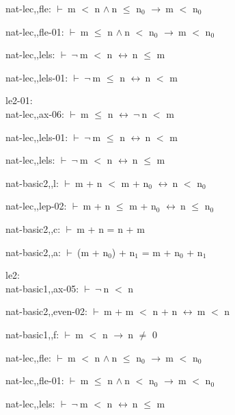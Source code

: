 \documentclass[a4paper]{article}
\newcommand{\Fol}{\mbox{$\vdash\ $}}
\newcommand{\Not}{\mbox{$\neg\ $}}
\newcommand{\And}{\mbox{$\wedge\ $}}
\newcommand{\Imp}{\mbox{$\rightarrow\ $}}
\newcommand{\Equiv}{\mbox{$\leftrightarrow\ $}}
\begin{document}
nat-lec,,fle: 
 \Fol m $<$ n \And n $\le$ $\mbox{n}_{0}$ \Imp m $<$ $\mbox{n}_{0}$



nat-lec,,fle-01: 
 \Fol m $\le$ n \And n $<$ $\mbox{n}_{0}$ \Imp m $<$ $\mbox{n}_{0}$



nat-lec,,lels: 
 \Fol \Not m $<$ n \Equiv n $\le$ m



nat-lec,,lels-01: 
 \Fol \Not m $\le$ n \Equiv n $<$ m



\bigskip

le2-01:\\ nat-lec,,ax-06: 
 \Fol m $\le$ n \Equiv \Not n $<$ m

nat-lec,,lels-01: 
 \Fol \Not m $\le$ n \Equiv n $<$ m



nat-lec,,lels: 
 \Fol \Not m $<$ n \Equiv n $\le$ m



nat-basic2,,l: 
 \Fol m + n $<$ m + $\mbox{n}_{0}$ \Equiv n $<$ $\mbox{n}_{0}$



nat-lec,,lep-02: 
 \Fol m + n $\le$ m + $\mbox{n}_{0}$ \Equiv n $\le$ $\mbox{n}_{0}$



nat-basic2,,c: 
 \Fol m + n = n + m



nat-basic2,,a: 
 \Fol (m + $\mbox{n}_{0}$) + $\mbox{n}_{1}$ = m + $\mbox{n}_{0}$ + $\mbox{n}_{1}$



\bigskip

le2:\\ nat-basic1,,ax-05: 
 \Fol \Not n $<$ n



nat-basic2,,even-02: 
 \Fol m + m $<$ n + n \Equiv m $<$ n



nat-basic1,,f: 
 \Fol m $<$ n \Imp n $\neq$ 0



nat-lec,,fle: 
 \Fol m $<$ n \And n $\le$ $\mbox{n}_{0}$ \Imp m $<$ $\mbox{n}_{0}$



nat-lec,,fle-01: 
 \Fol m $\le$ n \And n $<$ $\mbox{n}_{0}$ \Imp m $<$ $\mbox{n}_{0}$



nat-lec,,lels: 
 \Fol \Not m $<$ n \Equiv n $\le$ m
\end{document}
